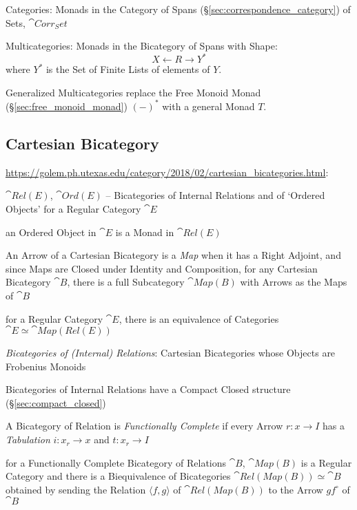 Categories: Monads in the Category of Spans
(\S\ref{sec:correspondence_category}) of Sets, $\cat{Corr_Set}$

Multicategories: Monads in the Bicategory of Spans with Shape:
\[
  X \leftarrow R \rightarrow Y^*
\]
where $Y^*$ is the Set of Finite Lists of elements of $Y$.

Generalized Multicategories replace the Free Monoid Monad
(\S\ref{sec:free_monoid_monad}) $(-)^*$ with a general Monad $T$.



\subsection{Cartesian Bicategory}\label{sec:cartesian_bicategory}

\url{https://golem.ph.utexas.edu/category/2018/02/cartesian_bicategories.html}:

$\cat{Rel(E)}$, $\cat{Ord(E)}$ -- Bicategories of Internal Relations and of
`Ordered Objects' for a Regular Category $\cat{E}$

an Ordered Object in $\cat{E}$ is a Monad in $\cat{Rel(E)}$

An Arrow of a Cartesian Bicategory is a \emph{Map} when it has a Right Adjoint,
and since Maps are Closed under Identity and Composition, for any Cartesian
Bicategory $\cat{B}$, there is a full Subcategory $\cat{Map(B)}$ with Arrows as
the Maps of $\cat{B}$

for a Regular Category $\cat{E}$, there is an equivalence of Categories
$\cat{E} \simeq \cat{Map(Rel(E))}$

\emph{Bicategories of (Internal) Relations}: Cartesian Bicategories whose
Objects are Frobenius Monoids

Bicategories of Internal Relations have a Compact Closed structure
(\S\ref{sec:compact_closed})

A Bicategory of Relation is \emph{Functionally Complete} if every Arrow $r : x
\rightarrow I$ has a \emph{Tabulation} $i : x_r \rightarrow x$ and $t : x_r
\rightarrow I$

for a Functionally Complete Bicategory of Relations $\cat{B}$, $\cat{Map(B)}$
is a Regular Category and there is a Biequivalence of Bicategories
$\cat{Rel(Map(B))} \simeq \cat{B}$ obtained by sending the Relation
$\langle{f,g}\rangle$ of $\cat{Rel(Map(B))}$ to the Arrow $gf^\circ$ of
$\cat{B}$



